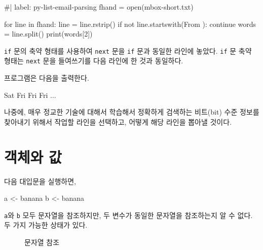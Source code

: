 \documentclass[
  letterpaper,
]{book}
\newenvironment{Shaded}{\begin{snugshade}}{\end{snugshade}}
\newcommand{\ExtensionTok}[1]{\textcolor[rgb]{0.00,0.23,0.31}{#1}}
\newcommand{\NormalTok}[1]{\textcolor[rgb]{0.00,0.23,0.31}{#1}}
\newcommand{\OtherTok}[1]{\textcolor[rgb]{0.00,0.23,0.31}{#1}}
\newcommand{\StringTok}[1]{\textcolor[rgb]{0.13,0.47,0.30}{#1}}
\begin{document}
\begin{Shaded}
\begin{Highlighting}[]
\NormalTok{\#| label: py{-}list{-}email{-}parsing}
\NormalTok{fhand = open(\textquotesingle{}mbox{-}short.txt\textquotesingle{})}

\NormalTok{for line in fhand:}
\NormalTok{    line = line.rstrip()}
\NormalTok{    if not line.startswith(\textquotesingle{}From \textquotesingle{}):}
\NormalTok{        continue}
\NormalTok{    words = line.split()}
\NormalTok{    print(words[2])}
\end{Highlighting}
\end{Shaded}

\texttt{if} 문의 축약 형태를 사용하여 \texttt{next} 문을 \texttt{if}
문과 동일한 라인에 놓았다. \texttt{if} 문 축약 형태는 \texttt{next} 문을
들여쓰기를 다음 라인에 한 것과 동일하다.

프로그램은 다음을 출력한다.

\begin{Shaded}
\begin{Highlighting}[]
\ExtensionTok{Sat}
\ExtensionTok{Fri}
\ExtensionTok{Fri}
\ExtensionTok{Fri}
\ExtensionTok{...}
\end{Highlighting}
\end{Shaded}

나중에, 매우 정교한 기술에 대해서 학습해서 정확하게 검색하는 비트(bit)
수준 정보를 찾아내기 위해서 작업할 라인을 선택하고, 어떻게 해당 라인을
뽑아낼 것이다.

\section{객체와 값}\label{r-list-object-value}

 

다음 대입문을 실행하면,

\begin{Shaded}
\begin{Highlighting}[]
\NormalTok{a }\OtherTok{\textless{}{-}} \StringTok{\textquotesingle{}banana\textquotesingle{}}
\NormalTok{b }\OtherTok{\textless{}{-}} \StringTok{\textquotesingle{}banana\textquotesingle{}}
\end{Highlighting}
\end{Shaded}

\texttt{a}와 \texttt{b} 모두 문자열을 참조하지만, 두 변수가 동일한
문자열을 참조하는지 알 수 없다. 두 가지 가능한 상태가 있다.

\begin{figure}


\caption{\label{fig-list-reference}문자열 참조}

\end{figure}%
\end{document}
